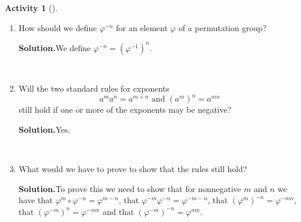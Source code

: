 \documentclass[10pt,]{book}
\theoremstyle{plain}
\theoremstyle{definition}
\newtheorem{activity}[project]{Activity}
\numberwithin{equation}{chapter}
\begin{document}
\begin{activity}[]\label{activity-242}
~\par
\begin{enumerate}[label=(\alph*)]
 \item How should we define \(\varphi^{-n}\) for an element \(\varphi\) of a permutation group?%
\par\medskip\noindent%
\textbf{Solution.}\quad We define \(\varphi^{-n}=\left(\varphi^{-1}\right)^n\).%

~\par
\item Will the two standard rules for exponents%
\begin{equation*}
a^ma^n=a^{m+n} \mbox{\ and\ }  (a^m)^n = a^{mn}
\end{equation*}
still hold if one or more of the exponents may be negative?%
\par\medskip\noindent%
\textbf{Solution.}\quad Yes.%

~\par
\item What would we have to prove to show that the rules still hold?%
\par\medskip\noindent%
\textbf{Solution.}\quad To prove this we need to show that for nonnegative \(m\) and \(n\) we have that \(\varphi^m\circ\varphi^{-n} =
\varphi^{m-n}\), that \(\varphi^{-m}\varphi^{-n} = \varphi^{-m-n}\), that \((\varphi^m)^{-n} = \varphi^{-mn}\), that \((\varphi^{-m})^n = \varphi^{-mn}\) and that \((\varphi^{-m})^{-n}= \varphi^{mn}\).%


\end{enumerate}
\end{activity}
\end{document}
